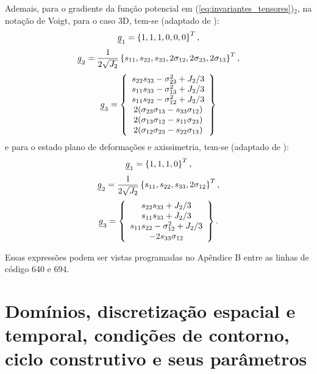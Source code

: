 Ademais, para o gradiente da função potencial em (\ref{eq:invariantes_tensores})$_2$, na notação de Voigt, para o caso 3D, tem-se (adaptado de ):
\begin{equation}
	\label{eq:g1_3D}
	\underline{g}_1 = \left\{1,1,1,0,0,0\right\}^T,
\end{equation}
\begin{equation}
	\label{eq:g2_3D}
	\underline{g}_2 = \dfrac{1}{2\sqrt{J_2}} \left\{s_{11},s_{22},s_{33},2\sigma_{12},2\sigma_{23},2\sigma_{13}\right\}^T,
\end{equation}
\begin{equation}
	\label{eq:g3_3D}
	\underline{g}_3 = \left\{
	\begin{array}{ccc}
	s_{22}s_{33}-\sigma_{23}^2 + J_2/3 \\
	s_{11}s_{33}-\sigma_{13}^2 + J_2/3 \\	
	s_{11}s_{22}-\sigma_{12}^2 + J_2/3 \\
	2(\sigma_{23}\sigma_{13}-s_{33}\sigma_{12}) \\
	2(\sigma_{13}\sigma_{12}-s_{11}\sigma_{23}) \\
	2(\sigma_{12}\sigma_{23}-s_{22}\sigma_{13})
	\end{array} \right\}
\end{equation}
e para o estado plano de deformações e axissimetria, tem-se (adaptado de ):
\begin{equation}
	\label{eq:g1_2D}
	\underline{g}_1 = \left\{1,1,1,0\right\}^T,
\end{equation}
\begin{equation}
	\label{eq:g2_2D}
	\underline{g}_2 = \dfrac{1}{2\sqrt{J_2}} \left\{s_{11},s_{22},s_{33},2\sigma_{12}\right\}^T,
\end{equation}
\begin{equation}
	\label{eq:g3_2D}
	\underline{g}_3 = \left\{
	\begin{array}{ccc}
		s_{22}s_{33} + J_2/3 \\
		s_{11}s_{33} + J_2/3 \\	
		s_{11}s_{22}-\sigma_{12}^2 + J_2/3 \\
		- 2s_{33}\sigma_{12}
	\end{array} \right\}.
\end{equation}

Essas expressões podem ser vistas programadas no Apêndice B entre as linhas de código 640 e 694.

\section{Domínios, discretização espacial e temporal, condições de contorno, ciclo construtivo e seus parâmetros}\label{secao_dominio}

